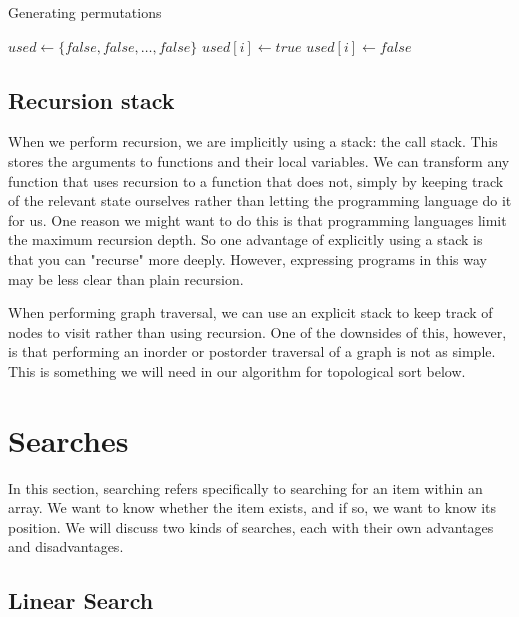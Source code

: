 \begin{algorithm}[H]
\caption{Generating permutations}
\begin{algorithmic}

\State $used \gets \{false, false, \ldots, false\}$
        \State {}
        \State \Return
    \EndIf
            \State $used[i] \gets true$
            \State {}
            \State $used[i] \gets false$
        \EndIf
    \EndFor
\EndFunction

\end{algorithmic}
\end{algorithm}


\subsection{Recursion stack}
When we perform recursion, we are implicitly using a stack: the call stack. This stores the arguments to functions and their local variables. We can transform any function that uses recursion to a function that does not, simply by keeping track of the relevant state ourselves rather than letting the programming language do it for us. One reason we might want to do this is that programming languages limit the maximum recursion depth. So one advantage of explicitly using a stack is that you can "recurse" more deeply. However, expressing programs in this way may be less clear than plain recursion.

When performing graph traversal, we can use an explicit stack to keep track of nodes to visit rather than using recursion. One of the downsides of this, however, is that performing an inorder or postorder traversal of a graph is not as simple. This is something we will need in our algorithm for topological sort below.

\section{Searches}

In this section, searching refers specifically to searching for an item within an array. We want to know whether the item exists, and if so, we want to know its position. We will discuss two kinds of searches, each with their own advantages and disadvantages.

\subsection{Linear Search}

